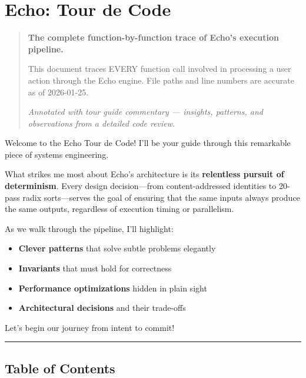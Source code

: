 \documentclass[11pt]{book}
\author{}
\date{}
\begin{document}
\frontmatter

\mainmatter
\chapter{Echo: Tour de Code}\label{echo-tour-de-code}

\begin{quote}
\textbf{The complete function-by-function trace of Echo's execution
pipeline.}

This document traces EVERY function call involved in processing a user
action through the Echo engine. File paths and line numbers are accurate
as of 2026-01-25.

\emph{Annotated with tour guide commentary --- insights, patterns, and observations from a detailed code review.}
\end{quote}

\begin{tourguide}
Welcome to the Echo Tour de Code! I'll be your guide through this remarkable piece of systems engineering.

What strikes me most about Echo's architecture is its \textbf{relentless pursuit of determinism}. Every design decision---from content-addressed identities to 20-pass radix sorts---serves the goal of ensuring that the same inputs always produce the same outputs, regardless of execution timing or parallelism.

As we walk through the pipeline, I'll highlight:
\begin{itemize}
\item \textbf{Clever patterns} that solve subtle problems elegantly
\item \textbf{Invariants} that must hold for correctness
\item \textbf{Performance optimizations} hidden in plain sight
\item \textbf{Architectural decisions} and their trade-offs
\end{itemize}

Let's begin our journey from intent to commit!
\end{tourguide}

\begin{center}\rule{0.5\linewidth}{0.5pt}\end{center}

\section{Table of Contents}\label{table-of-contents}
\end{document}
